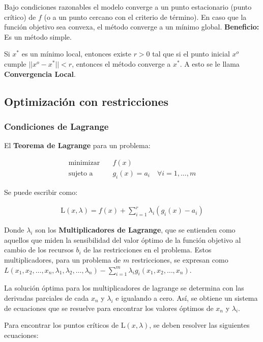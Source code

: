 \documentclass{article}
\begin{document}
Bajo condiciones razonables el modelo converge a un punto estacionario (punto crítico) de $f$ (o a un punto cercano con el criterio de término). En caso que la función objetivo sea convexa, el método converge a un mínimo global. \textbf{Beneficio:} Es un método simple.

Si $x^*$ es un mínimo local, entonces existe $r>0$ tal que si el punto inicial $x^o$ cumple $||x^o - x^*|| < r$, entonces el método converge a $x^*$. A esto se le llama \textbf{Convergencia Local}.

\subsection{Optimizaci\'on con restricciones}

\subsubsection{Condiciones de Lagrange}

El \textbf{Teorema de Lagrange} para un problema:

\begin{align*}
    \text{minimizar} \quad & f(x)                                        \\
    \text{sujeto a} \quad  & g_i(x) = a_i \quad \forall i = 1, \ldots, m
\end{align*}

Se puede escribir como:

\begin{align*}
    \mathrm{L}(x, \lambda) = f(x) + \sum_{i=1}^r \lambda_i (g_i(x) - a_i)
\end{align*}

Donde $\lambda_i$ son los \textbf{Multiplicadores de Lagrange}, que se entienden como aquellos que miden la sensibilidad del valor óptimo de la función objetivo al cambio de los recursos $b_i$ de las restricciones en el problema. Estos multiplicadores, para un problema de $m$ restricciones, se expresan como $L(x_1, x_2, \dots, x_n, \lambda_1, \lambda_2, \dots, \lambda_n) - \sum_{i=1}^{m} \lambda_i g_i(x_1,x_2,\dots,x_n)$.

La solución óptima para los multiplicadores de lagrange se determina con las derivadas parciales de cada $x_n$ y $\lambda_i$ e igualando a cero. Así, se obtiene un sistema de ecuaciones que se resuelve para encontrar los valores óptimos de $x_n$ y $\lambda_i$.

Para encontrar los puntos críticos de $\mathrm{L}(x, \lambda)$, se deben resolver las siguientes ecuaciones:
\end{document}
